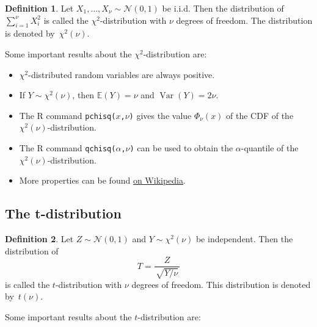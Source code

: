 \documentclass[
  a4paper,
]{article}
\theoremstyle{definition}
\newtheorem{definition}{Definition}[section]
\theoremstyle{definition}
\theoremstyle{definition}
\theoremstyle{definition}
\theoremstyle{remark}
\begin{document}
\begin{definition}
\protect\hypertarget{def:chi-squared-dist}{}\label{def:chi-squared-dist}Let \(X_1, \ldots, X_\nu \sim \mathcal{N}(0, 1)\) be i.i.d. Then the
distribution of \(\sum_{i=1}^\nu X_i^2\) is called the
\(\chi^2\)-distribution with \(\nu\) degrees of freedom. The
distribution is denoted by~\(\chi^2(\nu)\).
\end{definition}

Some important results about the \(\chi^2\)-distribution are:

\begin{itemize}
\item
  \(\chi^2\)-distributed random variables are always positive.
\item
  If \(Y\sim \chi^2(\nu)\), then \(\mathbb{E}(Y) = \nu\) and \(\mathop{\mathrm{Var}}(Y) = 2\nu\).
\item
  The R command \texttt{pchisq(\textbar{}}\(x\)\texttt{,}\(\nu\)\texttt{)} gives the value
  \(\Phi_\nu(x)\) of the CDF of the \(\chi^2(\nu)\)-distribution.
\item
  The R command \texttt{qchisq(}\(\alpha\)\texttt{,}\(\nu\)\texttt{)} can
  be used to obtain the
  \(\alpha\)-quantile of the \(\chi^2(\nu)\)-distribution.
\item
  More properties can be found
  \href{https://en.wikipedia.org/wiki/Chi-squared_distribution}{on Wikipedia}.
\end{itemize}

\hypertarget{t}{%
\subsection{The t-distribution}\label{t}}

\begin{definition}
\protect\hypertarget{def:t-dist}{}\label{def:t-dist}Let \(Z \sim \mathcal{N}(0,1)\) and \(Y \sim \chi^2(\nu)\) be independent. Then
the distribution of
\begin{equation}
  T
  = \frac{\,Z\,}{\,\sqrt{Y / \nu}\,}  \label{eq:t-def}
\end{equation}
is called the \(t\)-distribution with \(\nu\) degrees of freedom.
This distribution is denoted by~\(t(\nu)\).
\end{definition}

Some important results about the \(t\)-distribution are:
\end{document}
